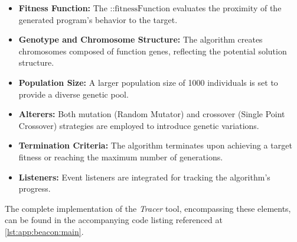         \begin{itemize}
            \item \textbf{Fitness Function:} The \(\text{::fitnessFunction}\) evaluates the proximity of the generated 
                program's behavior to the target.
            \item \textbf{Genotype and Chromosome Structure:} The algorithm creates chromosomes composed of function
                genes, reflecting the potential solution structure.
            \item \textbf{Population Size:} A larger population size of 1000 individuals is set to provide a diverse
                genetic pool.
            \item \textbf{Alterers:} Both mutation (Random Mutator) and crossover (Single Point Crossover) strategies
                are employed to introduce genetic variations.
            \item \textbf{Termination Criteria:} The algorithm terminates upon achieving a target fitness or reaching
                the maximum number of generations.
            \item \textbf{Listeners:} Event listeners are integrated for tracking the algorithm's progress.
        \end{itemize}
    
        The complete implementation of the \textit{Tracer} tool, encompassing these elements, can be found in the 
        accompanying code listing referenced at \vref{lst:app:beacon:main}.
    